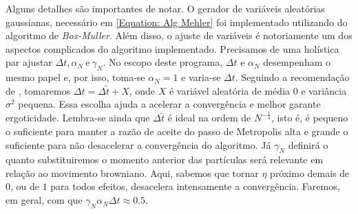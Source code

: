  Alguns detalhes são importantes de notar. O gerador de variáveis aleatórias gaussianas, necessário em \ref{Equation: Alg Mehler} foi implementado utilizando do algoritmo de \textit{Box-Muller}. Além disso, o ajuste de variáveis é notoriamente um dos aspectos complicados do algoritmo implementado. Precisamos de uma holística par ajustar $\Delta t, \alpha_N \ \text{e} \ \gamma_N$. No escopo deste programa, $\Delta t$ e $\alpha_N$ desempenham o mesmo papel e, por isso, toma-se $\alpha_N = 1$ e varia-se $\Delta t$. Seguindo a recomendação de \cite[Capítulo~5]{handbookmontecarlo}, tomaremos $\Delta t = \Delta\tilde{t} + X$, onde $X$ é variável aleatória de média $0$ e variância $\sigma^2$ pequena. Essa escolha ajuda a acelerar a convergência e melhor garante ergoticidade. Lembra-se ainda que $\Delta \tilde{t}$ é ideal na ordem de $N^{-\frac{1}{4}}$, isto é, é pequeno o suficiente para manter a razão de aceite do passo de Metropolis alta e grande o suficiente para não desacelerar a convergência do algoritmo. Já $\gamma_N$ definirá o quanto substituiremos o momento anterior das partículas será relevante em relação ao movimento browniano. Aqui, sabemos que tornar $\eta$ próximo demais de $0$, ou de $1$ para todos efeitos, desacelera intensamente a convergência. Faremos, em geral, com que $\gamma_N \alpha_N \Delta t \approx 0.5$.
 


